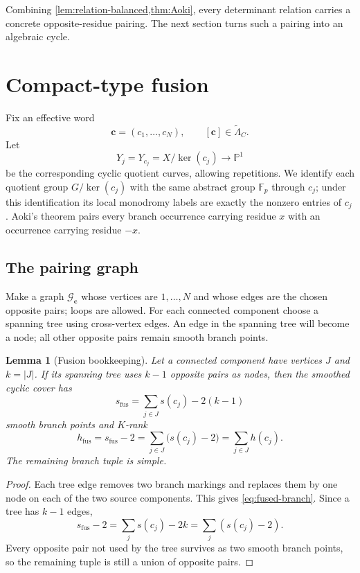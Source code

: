 \documentclass[11pt]{article}
\newtheorem{lemma}[theorem]{Lemma}
\theoremstyle{definition}
\theoremstyle{remark}
\newcommand{\F}{\mathbb F}
\newcommand{\PP}{\mathbb P}
\begin{document}
Combining \cref{lem:relation-balanced,thm:Aoki}, every determinant relation carries a concrete opposite-residue pairing.  The next section turns such a pairing into an algebraic cycle.

\section{Compact-type fusion}\label{sec:fusion}

Fix an effective word
\[
 \mathbf c=(c_1,\ldots,c_N),\qquad
 [\mathbf c]\in\widetilde\Lambda_C.
\]
Let
\[
 Y_j=Y_{c_j}=X/\ker(c_j)\longrightarrow\PP^1
\]
be the corresponding cyclic quotient curves, allowing repetitions.  We identify each quotient group $G/\ker(c_j)$ with the same abstract group $\F_p$ through $c_j$; under this identification its local monodromy labels are exactly the nonzero entries of $c_j$.  Aoki's theorem pairs every branch occurrence carrying residue $x$ with an occurrence carrying residue $-x$.

\subsection{The pairing graph}

Make a graph $\mathcal G_{\mathbf c}$ whose vertices are $1,\ldots,N$ and whose edges are the chosen opposite pairs; loops are allowed.  For each connected component choose a spanning tree using cross-vertex edges.  An edge in the spanning tree will become a node; all other opposite pairs remain smooth branch points.

\begin{lemma}[Fusion bookkeeping]\label{lem:fusion-rank}
Let a connected component have vertices $J$ and $k=|J|$.  If its spanning tree uses $k-1$ opposite pairs as nodes, then the smoothed cyclic cover has
\begin{equation}\label{eq:fused-branch}
 s_{\mathrm{fus}}=\sum_{j\in J}s(c_j)-2(k-1)
\end{equation}
smooth branch points and $K$-rank
\begin{equation}\label{eq:fused-rank}
 h_{\mathrm{fus}}=s_{\mathrm{fus}}-2
 =\sum_{j\in J}\bigl(s(c_j)-2\bigr)
 =\sum_{j\in J}h(c_j).
\end{equation}
The remaining branch tuple is simple.
\end{lemma}

\begin{proof}
Each tree edge removes two branch markings and replaces them by one node on each of the two source components.  This gives \eqref{eq:fused-branch}.  Since a tree has $k-1$ edges,
\[
 s_{\mathrm{fus}}-2
 =\sum_js(c_j)-2k
 =\sum_j(s(c_j)-2).
\]
Every opposite pair not used by the tree survives as two smooth branch points, so the remaining tuple is still a union of opposite pairs.
\end{proof}
\end{document}
